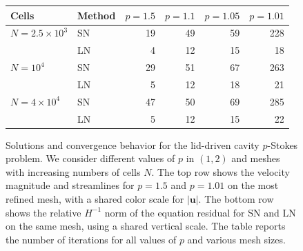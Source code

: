 \documentclass[11pt,pdflatex,sn-mathphys-num]{sn-jnl}
\theoremstyle{thmstyleone}%
\theoremstyle{thmstyletwo}%
\theoremstyle{thmstylethree}%
\newcommand{\bs}[1]{\ensuremath{\boldsymbol{#1}}}
\begin{document}
\begin{figure}[t]
    \par\vspace{1.5ex}
    {\small
    \begin{tabular}{llrrrr}
    \toprule
    Cells & Method & $p=1.5$ & $p=1.1$ & $p=1.05$ & $p=1.01$ \\
    \midrule
    $N=2.5\times10^3$ & SN & 19 & 49 & 59 & 228 \\
                      & LN & 4 & 12 & 15 & 18 \\
    \addlinespace
    $N=10^4$          & SN & 29 & 51 & 67 & 263 \\
                      & LN & 5 & 12 & 18 & 21 \\
    \addlinespace
    $N=4\times10^4$   & SN & 47 & 50 & 69 & 285 \\
                      & LN & 5 & 12 & 15 & 22 \\
    \bottomrule
    \end{tabular}}
    \caption{Solutions and convergence behavior for the lid-driven cavity $p$-Stokes problem. We consider different values of $p$ in $(1,2)$ and meshes with increasing numbers of cells $N$. The top row shows the velocity magnitude and streamlines for $p=1.5$ and $p=1.01$ on the most refined mesh, with a shared color scale for $|\bs u|$. The bottom row shows the relative $H^{-1}$ norm of the equation residual for SN and LN on the same mesh, using a shared vertical scale. The table reports the number of iterations for all values of $p$ and various mesh sizes.}
    \label{fig:lid-driven}
\end{figure}
\end{document}
